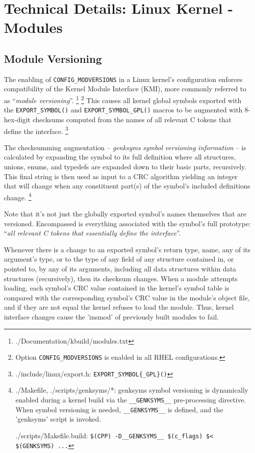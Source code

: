 \documentclass[10pt,oneside,english]{book}
\begin{document}
\chapter{Technical Details: Linux Kernel - Modules}

\section{Module Versioning}

The enabling of \texttt{CONFIG\_MODVERSIONS} in a Linux kernel's configuration
enforces compatibility of the Kernel Module Interface (KMI), more
commonly referred to as ``\emph{module versioning}''. \footnote{./Documentation/kbuild/modules.txt}
\footnote{Option \texttt{CONFIG\_MODVERSIONS} is enabled in all RHEL configurations.}
This causes all kernel global symbols exported with the \texttt{EXPORT\_SYMBOL()}
and \texttt{EXPORT\_SYMBOL\_GPL()} macros to be augmented with 8-hex-digit
checksums computed from the names of all relevant C tokens that define
the interface. \footnote{./include/linux/export.h: \texttt{EXPORT\_SYMBOL\{\_GPL\}()}}

The checksumming augmentation -- \emph{genksyms} \emph{symbol} \emph{versioning
information} -- is calculated by expanding the symbol to its full
definition where all structures, unions, enums, and typedefs are expanded
down to their basic parts, recursively. This final string is then
used as input to a CRC algorithm yielding an integer that will change
when any constituent part(s) of the symbol's included definitions
change. \footnote{./Makefile, ./scripts/genksyms/{*}: genksyms symbol versioning is
dynamically enabled during a kernel build via the \texttt{\_\_GENKSYMS\_\_}
pre-processing directive. When symbol versioning is needed, \texttt{\_\_GENKSYMS\_\_}
is defined, and the 'genksyms' script is invoked.

./scripts/Makefile.build: \texttt{\$(CPP) -D\_\_GENKSYMS\_\_ \$(c\_flags)
\$< \$(GENKSYMS) ...}}

Note that it's not just the globally exported symbol's names themselves
that are versioned. Encompassed is everything associated with the
symbol's full prototype: ``\emph{all relevant C tokens that essentially
define the interface}''.

Whenever there is a change to an exported symbol's return type, name,
any of its argument's type, or to the type of any field of any structure
contained in, or pointed to, by any of its arguments, including all
data structures within data structures (recursively), then its checksum
changes. When a module attempts loading, each symbol's CRC value contained
in the kernel's symbol table is compared with the corresponding symbol's
CRC value in the module's object file, and if they are not equal the
kernel refuses to load the module. Thus, kernel interface changes
cause the 'insmod' of previously built modules to fail.
\end{document}
